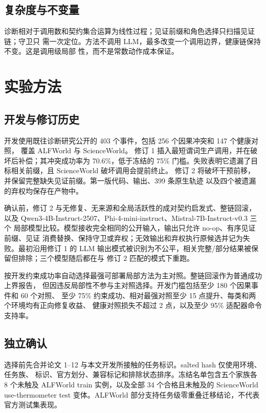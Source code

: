 \documentclass[10pt]{article}
\begin{document}
\subsection{复杂度与不变量}
诊断相对于调用数和契约集合运算为线性过程；见证前缀和角色选择只扫描见证链；守卫只
需一次定位。方法不调用 LLM，最多改变一个调用边界，健康链保持不变。这是调用级局部
性，而不是常数动作成本保证。

\section{实验方法}

\subsection{开发与修订历史}
开发使用既往诊断研究公开的 403 个事件，包括 256 个因果冲突和 147 个健康对照，
覆盖 ALFWorld 与 ScienceWorld\citep{shridhar2021alfworld,wang2022scienceworld}。
修订 1 插入最短谓词生产调用，并在破坏后补偿；其冲突成功率为 70.6\%，低于冻结的
75\% 门槛。失败表明它遗漏了目标相关前缀，且 ScienceWorld 破坏调用会提前终止。
修订 2 将破坏干预前移，并保留完整缺失见证前缀。第一版代码、输出、399 条原生轨迹
以及四个被遗漏的弃权均保存在产物中。

确认前，修订 2 与无修复、无来源和全局活跃性的成对契约启发式、整链回滚，以及
Qwen3-4B-Instruct-2507、Phi-4-mini-instruct、Mistral-7B-Instruct-v0.3 三个
局部模型比较。模型接收完全相同的公开输入，输出只允许 no-op、有序见证前缀、见证
消费替换、保持守卫或弃权；无效输出和弃权执行原候选并记为失败。最初沿用修订 1 的
LLM 输出模式被识别为不公平，相关完整/部分结果被保留但排除；三个模型随后都在与
修订 2 匹配的模式下重跑。

按开发约束成功率自动选择最强可部署局部方法为主对照。整链回滚作为普通成功上界报告，
但因违反局部性不参与主对照选择。开发门槛包括至少 180 个因果事件和 60 个对照、
至少 75\% 约束成功、相对最强对照至少 15 点提升、每类和两个环境均有正向修复收益、
健康对照损失不超过 2 点，以及至少 95\% 适配器命令支持率。

\subsection{独立确认}
选择前先合并论文 1--12 与本文开发所接触的任务标识。salted hash 仅使用环境、任务族、
标识、官方划分、兼容标记和排除状态排序。冻结名单包含五个家族各 8 个未触及
ALFWorld train 实例，以及全部 34 个合格且未触及的 ScienceWorld use-thermometer
test 变体。ALFWorld 部分支持任务级零重叠迁移结论，不代表官方测试集表现。
\end{document}
